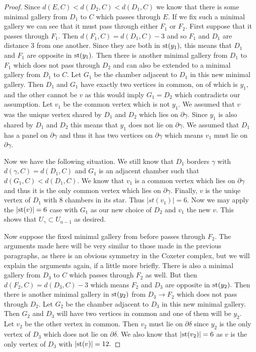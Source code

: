 \documentclass[class=book, crop=false]{standalone}
\begin{document}
\begin{proof}
Since $d(E,C)<d(D_2,C)<d(D_1,C)$ we know that there is some minimal gallery from $D_1$ to $C$ which passes through $E.$ If we fix such a minimal gallery we can see that it must pass through either $F_1$ or $F_2.$ First suppose that it passes through $F_1.$ Then $d(F_1,C)=d(D_1,C)-3$ and so $F_1$ and $D_1$ are distance 3 from one another. Since they are both in $\mathrm{st}(y_1),$ this means that $D_1$ and $F_1$ are opposite in $\mathrm{st}(y_1).$ Then there is another minimal gallery from $D_1$ to $F_1$ which does not pass through $D_2$ and can also be extended to a minimal gallery from $D_1$ to $C.$ Let $G_1$ be the chamber adjacent to $D_1$ in this new minimal gallery. Then $D_1$ and $G_1$ have exactly two vertices in common, on of which is $y_1,$ and the other cannot be $v$ as this would imply $G_1=D_2$ which contradicts our assumption. Let $v_1$ be the common vertex which is not $y_1.$ We assumed that $v$ was the unique vertex shared by $D_1$ and $D_2$ which lies on $\partial \gamma.$ Since $y_1$ is also shared by $D_1$ and $D_2$ this means that $y_1$ does not lie on $\partial \gamma.$ We assumed that $D_1$ has a panel on $\partial \gamma$ and thus it has two vertices on $\partial \gamma$ which means $v_1$ must lie on $\partial \gamma.$

Now we have the following situation. We still know that $D_1$ borders $\gamma$ with $d(\gamma,C)=d(D_1,C)$ and $G_1$ is an adjacent chamber such that $d(G_1,C)<d(D_1,C).$ We know that $v_1$ is a common vertex which lies on $\partial\gamma$ and thus it is the only common vertex which lies on $\partial\gamma.$ Finally, $v$ is the uniqe vertex of $D_1$ with 8 chambers in its star. Thus $|st(v_1)|=6.$ Now we may apply the $|\mathrm{st}(v)|=6$ case with $G_1$ as our new choice of $D_2$ and $v_1$ the new $v.$ This shows that $U_\gamma\subset U_{n-1}$ as desired.

Now suppose the fixed minimal gallery from before passes through $F_2.$ The arguments made here will be very similar to those made in the previous paragraphs, as there is an obvious symmetry in the Coxeter complex, but we will explain the arguments again, if a little more briefly. There is also a minimal gallery from $D_3$ to $C$ which passes through $F_2$ as well. But then $d(F_2,C)=d(D_3,C)-3$ which means $F_2$ and $D_3$ are opposite in $\mathrm{st}(y_2).$ Then there is another minimal gallery in $\mathrm{st}(y_2)$ from $D_3\to F_2$ which does not pass through $D_2.$ Let $G_2$ be the chamber adjacent to $D_3$ in this new minimal gallery. Then $G_2$ and $D_3$ will have two vertices in common and one of them will be $y_2.$ Let $v_2$ be the other vertex in common. Then $v_2$ must lie on $\partial \delta$ since $y_2$ is the only vertex of $D_3$ which does not lie on $\partial \delta.$ We also know that $|\mathrm{st}(v_2)|=6$ as $v$ is the only vertex of $D_3$ with $|\mathrm{st}(v)|=12.$


\end{proof}
\end{document}
